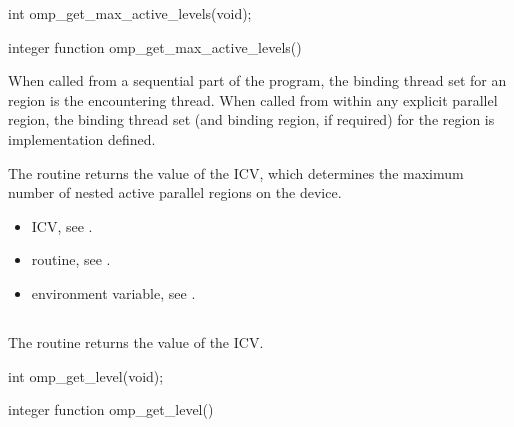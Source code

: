 \format
\ccppspecificstart
\begin{boxedcode}
int omp\_get\_max\_active\_levels(void);
\end{boxedcode}
\ccppspecificend

\fortranspecificstart
\begin{boxedcode}
integer function omp\_get\_max\_active\_levels()
\end{boxedcode}
\fortranspecificend

\binding
When called from a sequential part of the program, the binding thread set for an 
 region is the encountering thread. When called 
from within any explicit parallel region, the binding thread set (and binding region, if 
required) for the  region is implementation defined. 

\effect
The  routine returns the value of the  ICV,
which determines the maximum number of nested active parallel regions 
on the device. 

\crossreferences
\begin{itemize}
\item {} ICV, see 
.

\item {} routine, see 
.

\item {} environment variable, see 
.
\end{itemize}








\subsection{}
\label{subsec:omp_get_level}
\summary
The  routine returns the value of the  ICV. 

\format
\ccppspecificstart
\begin{boxedcode}
int omp\_get\_level(void);
\end{boxedcode}
\ccppspecificend

\fortranspecificstart
\begin{boxedcode}
integer function omp\_get\_level()
\end{boxedcode}
\fortranspecificend

